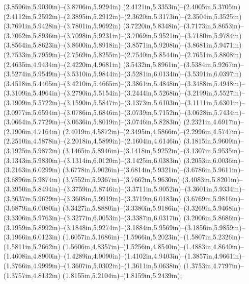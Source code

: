 (3.8596in,5.9030in)--(3.8706in,5.9294in) (2.4121in,5.3353in)--(2.4005in,5.3705in) (2.4112in,5.2592in)--(2.3895in,5.2912in)--(2.3620in,5.3173in)--(2.3504in,5.3525in) (3.7691in,5.9428in)--(3.7801in,5.9692in) (3.7220in,5.8348in)--(3.7173in,5.8653in)--(3.7062in,5.8936in)--(3.7098in,5.9231in)--(3.7069in,5.9521in)--(3.7180in,5.9784in) (3.8564in,5.8623in)--(3.8600in,5.8918in)--(3.8571in,5.9208in)--(3.8681in,5.9471in) (2.7533in,5.7959in)--(2.7569in,5.8255in)--(2.7540in,5.8544in)--(2.7651in,5.8808in) (2.4635in,4.9434in)--(2.4220in,4.9681in) (3.5432in,5.8961in)--(3.5384in,5.9267in)--(3.5274in,5.9549in)--(3.5310in,5.9844in)--(3.5281in,6.0134in)--(3.5391in,6.0397in) (3.4518in,5.4405in)--(3.4210in,5.4665in)--(3.3861in,5.4848in)--(3.3488in,5.4948in)--(3.3109in,5.4964in)--(3.2790in,5.5154in)--(3.2444in,5.5268in)--(3.2199in,5.5527in)--(3.1909in,5.5722in)--(3.1590in,5.5847in)--(3.1373in,5.6103in)--(3.1111in,5.6301in)--(3.0977in,5.6594in)--(3.0786in,5.6846in)--(3.0739in,5.7152in)--(3.0628in,5.7434in)--(3.0664in,5.7729in)--(3.0636in,5.8019in)--(3.0746in,5.8283in) (2.2321in,4.6917in)--(2.1906in,4.7164in) (2.4019in,4.5872in)--(2.3495in,4.5866in)--(2.2996in,4.5747in)--(2.2510in,4.5878in)--(2.2018in,4.5899in)--(2.1604in,4.6146in) (3.1815in,5.9609in)--(3.1925in,5.9872in) (3.1465in,5.8946in)--(3.1418in,5.9252in)--(3.1307in,5.9535in)--(3.1343in,5.9830in)--(3.1314in,6.0120in)--(3.1425in,6.0383in) (3.2053in,6.0036in)--(3.2163in,6.0299in) (3.6778in,5.9026in)--(3.6814in,5.9321in)--(3.6786in,5.9611in)--(3.6896in,5.9874in) (3.7552in,5.9367in)--(3.7662in,5.9630in) (3.4083in,5.8201in)--(3.3950in,5.8494in)--(3.3759in,5.8746in)--(3.3711in,5.9052in)--(3.3601in,5.9334in)--(3.3637in,5.9629in)--(3.3608in,5.9919in)--(3.3719in,6.0183in) (3.6769in,5.9816in)--(3.6879in,6.0080in) (3.3427in,5.8880in)--(3.3380in,5.9186in)--(3.3269in,5.9468in)--(3.3306in,5.9763in)--(3.3277in,6.0053in)--(3.3387in,6.0317in) (3.2006in,5.8686in)--(3.1959in,5.8992in)--(3.1848in,5.9274in)--(3.1884in,5.9569in)--(3.1856in,5.9859in)--(3.1966in,6.0123in) (1.6057in,5.1686in)--(1.5966in,5.2023in)--(1.5807in,5.2326in)--(1.5811in,5.2662in) (1.5606in,4.8357in)--(1.5256in,4.8540in)--(1.4883in,4.8640in)--(1.4608in,4.8900in)--(1.4289in,4.9090in)--(1.4102in,4.9403in)--(1.3857in,4.9661in)--(1.3766in,4.9999in)--(1.3607in,5.0302in)--(1.3611in,5.0638in) (1.3753in,4.7797in)--(1.3757in,4.8132in) (1.8155in,5.2104in)--(1.8159in,5.2439in);
